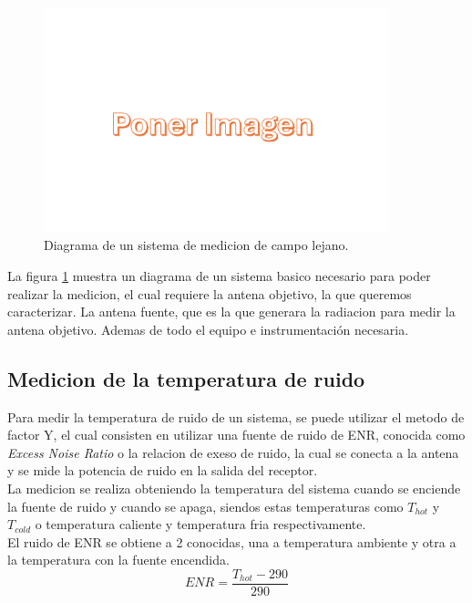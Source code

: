 \begin{figure}
    \centering
    \includegraphics[width = 10cm]{img/imagen.png}
    \caption{Diagrama de un sistema de medicion de campo lejano.}
    \label{fig:farfield}
\end{figure}

La figura \ref{fig:farfield} muestra un diagrama de un sistema basico necesario para poder realizar la medicion, el cual requiere la antena objetivo, la que queremos caracterizar. La antena fuente, que es la que generara la radiacion para medir la antena objetivo. Ademas de todo el equipo e instrumentación necesaria.\\

\subsection{Medicion de la temperatura de ruido}

Para medir la temperatura de ruido de un sistema, se puede utilizar el metodo de factor Y, el cual consisten en utilizar una fuente de ruido de ENR, conocida como \textit{Excess Noise Ratio} o la relacion de exeso de ruido, la cual se conecta a la antena y se mide la potencia de ruido en la salida del receptor.\\

La medicion se realiza obteniendo la temperatura del sistema cuando se enciende la fuente de ruido y cuando se apaga, siendos estas temperaturas como $T_{hot}$ y $T_{cold}$ o temperatura caliente y temperatura fria respectivamente.\\

El ruido de ENR se obtiene a 2  conocidas, una a temperatura ambiente y otra a la temperatura con la fuente encendida.\\

\begin{equation}
    ENR = \frac{T_{hot} - 290}{290}
\end{equation}

